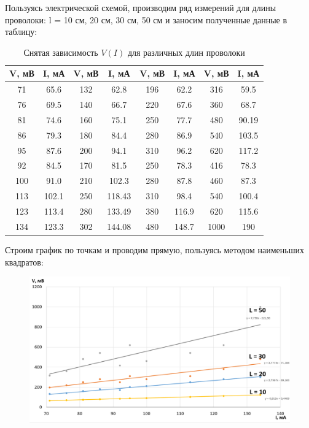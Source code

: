 \documentclass[a4paper, 12pt]{article}
\begin{document}
    Пользуясь электрической схемой, производим ряд измерений для длины проволоки: l = 10 см, 20 см, 30 см, 50 см и заносим полученные данные в таблицу: 
    \begin{table}[H]
    \centering
    \begin{tabular}{|c|c||c|c||c|c||c|c|}
        \hline
        V, мВ & I, мА & V, мВ & I, мА & V, мВ & I, мА & V, мВ & I, мА \\
        \hline
         71 & 65.6 & 132 & 62.8 & 196 & 62.2 & 316 & 59.5\\
        \hline
         76 & 69.5 & 140 & 66.7 & 220 & 67.6 & 360 & 68.7\\
        \hline
         81 & 74.6 & 160 & 75.1 & 250 & 77.7 & 480 & 90.19 \\
        \hline
         86 & 79.3 & 180 & 84.4 & 280 & 86.9 & 540 & 103.5\\
        \hline
         95 & 87.6 & 200 & 94.1 & 310 & 96.2 & 620 & 117.2\\
        \hline
         92 & 84.5 & 170 & 81.5 & 250 & 78.3 & 416 & 78.3\\
        \hline
         100 & 91.0 & 210 & 102.3 & 280 & 87.8 & 460 & 87.3\\
        \hline
         113 & 102.1 & 250 & 118.43 & 310 & 98.4 & 540 & 100.4\\
        \hline
         123 & 113.4 & 280 & 133.49 & 380 & 116.9 & 620 & 115.6\\
        \hline
         134 & 123.3 & 302 & 144.08 & 480 & 148.7 & 1000 & 190\\
        \hline
    \end{tabular}
    \caption{Снятая зависимость $V(I)$ для различных длин проволоки}
    \end{table}

    Строим график по точкам и проводим прямую, пользуясь методом наименьших квадратов:
    \begin{figure}[H]
        \centering
        \includegraphics[width=\textwidth]{R}
    \end{figure}
    
\end{document}
